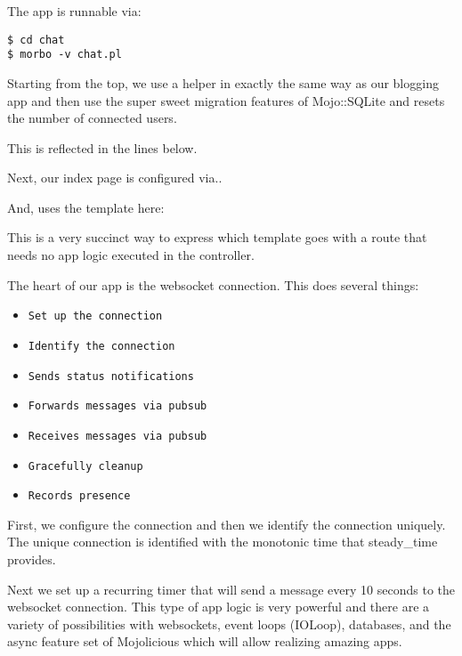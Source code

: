 \documentclass[14pt]{extreport}
\begin{document}
The app is runnable via:

\begin{lstlisting}[style=BashInputStyle]
$ cd chat
$ morbo -v chat.pl
\end{lstlisting}

Starting from the top, we use a helper in exactly the same way as our blogging
app and then use the super sweet migration features of Mojo::SQLite and resets the
number of connected users.

This is reflected in the lines below.



Next, our index page is configured via..



\clearpage

And, uses the template here:



This is a very succinct way to express which template goes with a route that
needs no app logic executed in the controller.

The heart of our app is the websocket connection.  This does several things:

\begin{itemize} \itemsep1pt \parskip0pt 
\item \verb|Set up the connection|
\item \verb|Identify the connection|
\item \verb|Sends status notifications|
\item \verb|Forwards messages via pubsub|
\item \verb|Receives messages via pubsub|
\item \verb|Gracefully cleanup|
\item \verb|Records presence|
\end{itemize}

First, we configure the connection and then we identify the connection
uniquely.  The unique connection is identified with the monotonic time that
steady\_time provides.



Next we set up a recurring timer that will send a message every 10 seconds to
the websocket connection.  This type of app logic is very powerful and there
are a variety of possibilities with websockets, event loops (IOLoop),
databases, and the async feature set of Mojolicious which will allow realizing
amazing apps.
\end{document}
